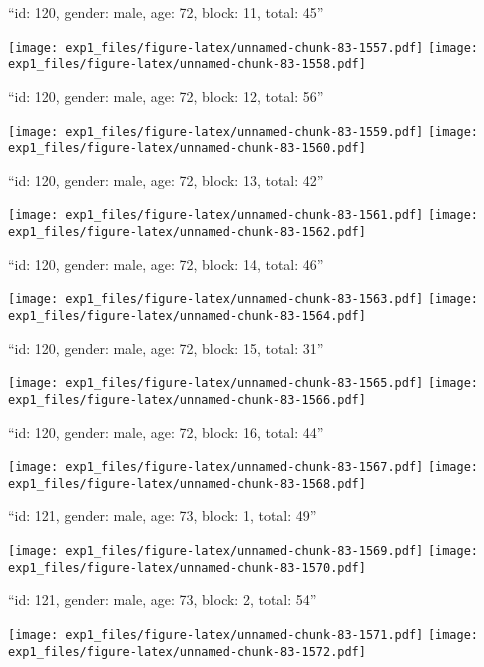 \documentclass[11pt,,]{article}
\begin{document}
\newpage
[1] 

``id: 120, gender: male, age: 72, block: 11, total: 45''

\texttt{[image: exp1\_files/figure-latex/unnamed-chunk-83-1557.pdf]}
\texttt{[image: exp1\_files/figure-latex/unnamed-chunk-83-1558.pdf]}

\newpage
[1] 

``id: 120, gender: male, age: 72, block: 12, total: 56''

\texttt{[image: exp1\_files/figure-latex/unnamed-chunk-83-1559.pdf]}
\texttt{[image: exp1\_files/figure-latex/unnamed-chunk-83-1560.pdf]}

\newpage
[1] 

``id: 120, gender: male, age: 72, block: 13, total: 42''

\texttt{[image: exp1\_files/figure-latex/unnamed-chunk-83-1561.pdf]}
\texttt{[image: exp1\_files/figure-latex/unnamed-chunk-83-1562.pdf]}

\newpage
[1] 

``id: 120, gender: male, age: 72, block: 14, total: 46''

\texttt{[image: exp1\_files/figure-latex/unnamed-chunk-83-1563.pdf]}
\texttt{[image: exp1\_files/figure-latex/unnamed-chunk-83-1564.pdf]}

\newpage
[1] 

``id: 120, gender: male, age: 72, block: 15, total: 31''

\texttt{[image: exp1\_files/figure-latex/unnamed-chunk-83-1565.pdf]}
\texttt{[image: exp1\_files/figure-latex/unnamed-chunk-83-1566.pdf]}

\newpage
[1] 

``id: 120, gender: male, age: 72, block: 16, total: 44''

\texttt{[image: exp1\_files/figure-latex/unnamed-chunk-83-1567.pdf]}
\texttt{[image: exp1\_files/figure-latex/unnamed-chunk-83-1568.pdf]}

\newpage
[1] 

``id: 121, gender: male, age: 73, block: 1, total: 49''

\texttt{[image: exp1\_files/figure-latex/unnamed-chunk-83-1569.pdf]}
\texttt{[image: exp1\_files/figure-latex/unnamed-chunk-83-1570.pdf]}

\newpage
[1] 

``id: 121, gender: male, age: 73, block: 2, total: 54''

\texttt{[image: exp1\_files/figure-latex/unnamed-chunk-83-1571.pdf]}
\texttt{[image: exp1\_files/figure-latex/unnamed-chunk-83-1572.pdf]}
\end{document}
